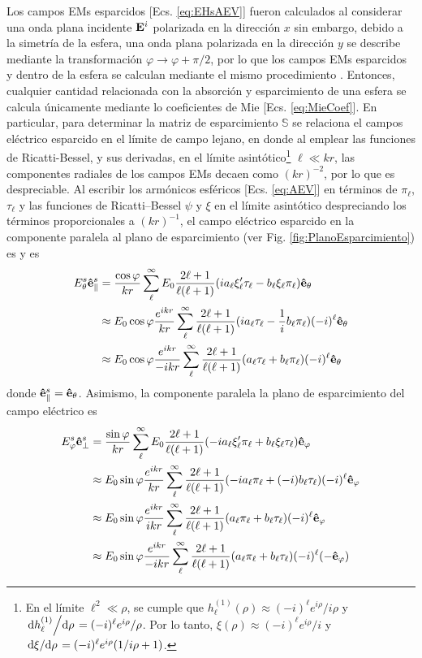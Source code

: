 \documentclass[letterpaper,11pt] {article}
\begin{document}
Los campos EMs esparcidos [Ecs. \eqref{eq:EHsAEV}] fueron calculados al considerar una onda plana incidente $\vb{E}^i$ polarizada en la dirección $x$ sin embargo, debido a la simetría de la esfera, una onda plana polarizada en la dirección $y$ se describe mediante la transformación $\varphi\to\varphi+\pi/2$, por lo que los campos EMs esparcidos y dentro de la esfera se calculan mediante el mismo procedimiento \cite{bohren1998absorption}. Entonces, cualquier cantidad relacionada con la absorción y esparcimiento de una esfera se calcula únicamente mediante lo coeficientes de Mie [Ecs. \eqref{eq:MieCoef}]. En particular, para determinar la matriz de esparcimiento $\mathbb{S}$ se relaciona el campos eléctrico esparcido en el límite de campo lejano, en donde al emplear las funciones de Ricatti-Bessel, y sus derivadas, en el límite asintótico\footnote{En el límite $\ell^2 \ll \rho$, se cumple que $h_\ell^{(1)}(\rho)\approx (-i)^\ell e^{i\rho}/i\rho$ y $\dv*{h_\ell^{(1)}}{\rho} = (-i)^\ell e^{i\rho}/\rho$. Por lo tanto,  $\xi(\rho)\approx (-i)^\ell e^{i\rho}/i$ y $\dv*{\xi}{\rho} = (-i)^\ell e^{i\rho}(1/i\rho + 1)$.} $\ell \ll kr$, las componentes radiales de los campos EMs decaen como $(kr)^{-2}$, por lo que es despreciable. Al escribir los armónicos esféricos  [Ecs. \eqref{eq:AEV}] en términos de $\pi_\ell$, $\tau_\ell$ y las funciones de Ricatti--Bessel $\psi$ y $\xi$ en el límite asintótico despreciando los términos proporcionales a $(kr)^{-1}$, el campo eléctrico esparcido en la componente paralela al plano de esparcimiento (ver Fig. \ref{fig:PlanoEsparcimiento}) es
  y  es
	\begin{align}
	E_\theta^s \vu{e}_\parallel^s &= \frac{\cos\varphi}{kr}\sum_\ell^\infty E_0\frac{2\ell+1}{\ell(\ell+1)}
						(i a_\ell\xi_\ell'\tau_\ell-b_\ell\xi_\ell\pi_\ell)\vu{e}_\theta\notag\\
			&\approx E_0\cos\varphi\frac{e^{ikr}}{kr}\sum_\ell^\infty\frac{2\ell+1}{\ell(\ell+1)}
				(i a_\ell \tau_\ell - \frac{1}{i}b_\ell\pi_\ell )(-i)^\ell\vu{e}_\theta\notag\\
			&\approx E_0\cos\varphi\frac{e^{ikr}}{-ikr}\sum_\ell^\infty\frac{2\ell+1}{\ell(\ell+1)}
				( a_\ell \tau_\ell + b_\ell\pi_\ell )(-i)^\ell\vu{e}_\theta
								\label{eq:EthetaS}
	\end{align}
donde $\vu{e}_\parallel^s =\vu{e}_\theta$. Asimismo, la componente paralela la plano de esparcimiento del campo eléctrico es
	\begin{align}
	E_\varphi^s \vu{e}_\perp^s &= \frac{\sin\varphi}{kr}\sum_\ell^\infty E_0\frac{2\ell+1}{\ell(\ell+1)}						(-ia_\ell\xi_\ell'\pi_\ell+b_\ell\xi_\ell\tau_\ell)\vu{e}_\varphi\notag\\
			&\approx E_0\sin\varphi\frac{e^{ikr}}{kr}\sum_\ell^\infty\frac{2\ell+1}{\ell(\ell+1)}					(-ia_\ell\pi_\ell+(-i)b_\ell\tau_\ell)(-i)^\ell\vu{e}_\varphi\notag\\
			&\approx E_0\sin\varphi\frac{e^{ikr}}{ikr}\sum_\ell^\infty\frac{2\ell+1}{\ell(\ell+1)}					(a_\ell\pi_\ell+b_\ell\tau_\ell)(-i)^\ell\vu{e}_\varphi\notag\\
			&\approx E_0\sin\varphi\frac{e^{ikr}}{-ikr}\sum_\ell^\infty\frac{2\ell+1}{\ell(\ell+1)}					(a_\ell\pi_\ell+b_\ell\tau_\ell)(-i)^\ell(-\vu{e}_\varphi)
								\label{eq:EphiS}
	\end{align}
\end{document}
